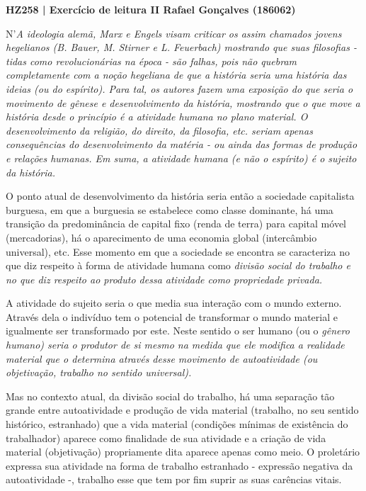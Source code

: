\documentclass[12pt]{article}
\begin{document}
\noindent
\large\textbf{HZ258 | Exercício de leitura II \hfill Rafael Gonçalves (186062)}
\break\hfill

N'\em A ideologia alemã\em, Marx e Engels visam criticar os assim chamados jovens hegelianos (B. Bauer, M. Stirner e L. Feuerbach) mostrando que suas filosofias - tidas como revolucionárias na época - são falhas, pois não quebram completamente com a noção hegeliana de que a história seria uma história das ideias (ou do espírito).
Para tal, os autores fazem uma exposição do que seria o movimento de gênese e desenvolvimento da história, mostrando que o que move a história desde o princípio é a \em atividade humana \em no plano material.
O desenvolvimento da religião, do direito, da filosofia, etc. seriam apenas consequências do desenvolvimento da matéria - ou ainda das formas de produção e relações humanas. Em suma, a atividade humana (e não o espírito) é o sujeito da história.

O ponto atual de desenvolvimento da história seria então a sociedade capitalista burguesa, em que a burguesia se estabelece como classe dominante, há uma transição da predominância de capital fixo (renda de terra) para capital móvel (mercadorias), há o aparecimento de uma economia global (intercâmbio universal), etc.
Esse momento em que a sociedade se encontra se caracteriza no que diz respeito à forma de atividade humana como \em divisão social do trabalho \em e no que diz respeito ao produto dessa atividade como \em propriedade privada\em .

A atividade do sujeito seria o que media sua interação com o mundo externo. Através dela o indivíduo tem o potencial de transformar o mundo material e igualmente ser transformado por este. Neste sentido o ser humano (ou o \em gênero humano\em) seria o produtor de si mesmo na medida que ele modifica a realidade material que o determina através desse movimento de autoatividade (ou objetivação, trabalho no sentido universal).

Mas no contexto atual, da divisão social do trabalho, há uma separação tão grande entre autoatividade e produção de vida material (trabalho, no seu sentido histórico, estranhado) que a vida material (condições mínimas de existência do trabalhador) aparece como finalidade de sua atividade e a criação de vida material (objetivação) propriamente dita aparece apenas como meio.
O proletário expressa sua atividade na forma de trabalho estranhado - expressão negativa da autoatividade -, trabalho esse que tem por fim suprir as suas carências vitais.
\end{document}
